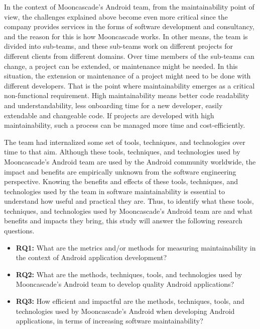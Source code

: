 In the context of Mooncascade's Android team, from the maintainability point of view, the challenges explained above become even more critical since the company provides services in the forms of software development and consultancy, and the reason for this is how Mooncascade works. In other means, the team is divided into sub-teams, and these sub-teams work on different projects for different clients from different domains. Over time members of the sub-teams can change, a project can be extended, or maintenance might be needed. In this situation, the extension or maintenance of a project might need to be done with different developers. That is the point where maintainability emerges as a critical non-functional requirement. High maintainability means better code readability and understandability, less onboarding time for a new developer, easily extendable and changeable code. If projects are developed with high maintainability, such a process can be managed more time and cost-efficiently.

The team had internalized some set of tools, techniques, and technologies over time to that aim. Although these tools, techniques, and technologies used by Mooncascade's Android team are used by the Android community worldwide, the impact and benefits are empirically unknown from the software engineering perspective. Knowing the benefits and effects of these tools, techniques, and technologies used by the team in software maintainability is essential to understand how useful and practical they are. Thus, to identify what these tools, techniques, and technologies used by Mooncascade's Android team are and what benefits and impacts they bring, this study will answer the following research questions. 

\begin{itemize}
\item \noindent\textbf{RQ1:} What are the metrics and/or methods for measuring maintainability in the context of Android application development?
\item \noindent\textbf{RQ2:} What are the methods, techniques, tools, and technologies used by Mooncascade's Android team to develop quality Android applications?
\item \noindent\textbf{RQ3:} How efficient and impactful are the methods, techniques, tools, and technologies used by Mooncascade's Android when developing Android applications, in terms of increasing software maintainability?
\end{itemize}